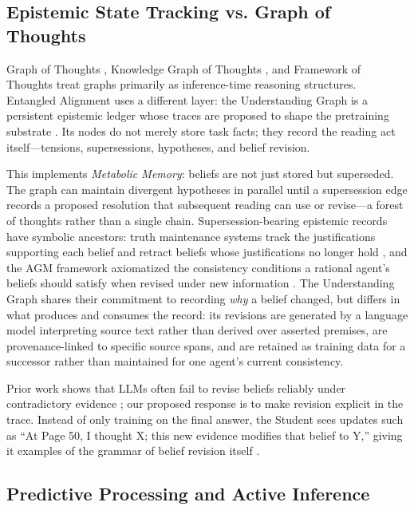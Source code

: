 \subsection{Epistemic State Tracking vs. Graph of Thoughts}

Graph of Thoughts \cite{besta2024graph}, Knowledge Graph of Thoughts
\cite{besta2025kgot}, and Framework of Thoughts \cite{fricke2026fot} treat
graphs primarily as inference-time reasoning structures. Entangled Alignment
uses a different layer: the Understanding Graph is a persistent epistemic
ledger whose traces are proposed to shape the pretraining substrate
\cite{westerberg2026understanding}. Its nodes do not merely store task facts;
they record the reading act itself---tensions, supersessions, hypotheses, and
belief revision.

This implements \emph{Metabolic Memory}: beliefs are not just stored but
superseded. The graph can maintain divergent hypotheses in parallel until a
supersession edge records a proposed resolution that subsequent reading can use
or revise---a forest of thoughts rather than a single chain. Supersession-bearing epistemic records have symbolic ancestors:
truth maintenance systems track the justifications supporting each belief and
retract beliefs whose justifications no longer hold \cite{doyle1979tms}, and the
AGM framework axiomatized the consistency conditions a rational agent's beliefs
should satisfy when revised under new information \cite{alchourron1985agm}. The
Understanding Graph shares their commitment to recording \emph{why} a belief
changed, but differs in what produces and consumes the record: its revisions are
generated by a language model interpreting source text rather than derived over
asserted premises, are provenance-linked to specific source spans, and are
retained as training data for a successor rather than maintained for one agent's
current consistency.

Prior work shows that LLMs often fail to revise beliefs reliably
under contradictory evidence \cite{xu2024belief}; our proposed response is to
make revision explicit in the trace. Instead of only training on the final
answer, the Student sees updates such as ``At Page 50, I thought X; this new
evidence modifies that belief to Y,'' giving it examples of the grammar of
belief revision itself \cite{didolkar2024metacognitive, xu2024belief}.

\subsection{Predictive Processing and Active Inference}


